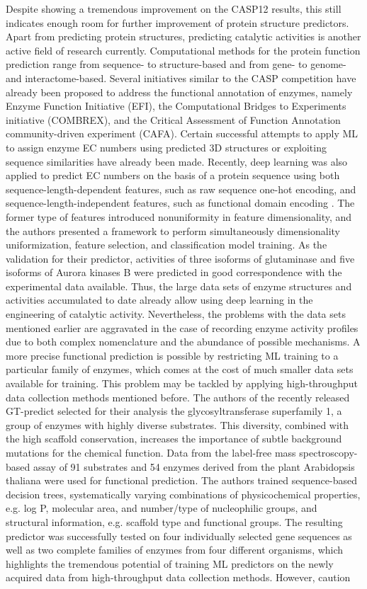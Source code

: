 \documentclass[12pt]{article}
\begin{document}
Despite showing a tremendous improvement on the CASP12 results, this still indicates enough room for further improvement of protein structure predictors. Apart from predicting protein structures, predicting catalytic activities is another active ﬁeld of research currently. Computational methods for the protein function prediction range from sequence- to structure-based and from gene- to genome- and interactome-based\cite{62}. Several initiatives similar to the CASP competition have already been proposed to address the functional annotation of enzymes, namely Enzyme Function Initiative (EFI), the Computational Bridges to Experiments initiative (COMBREX), and the Critical Assessment of Function Annotation community-driven experiment (CAFA). Certain successful attempts to apply ML to assign enzyme EC numbers using predicted 3D structures \cite{63} or exploiting sequence similarities \cite{64} have already been made. Recently, deep learning was also applied to predict EC numbers on the basis of a protein sequence using both sequence-length-dependent features, such as raw sequence one-hot encoding, and sequence-length-independent features, such as functional domain encoding \cite{65}. The former type of features introduced nonuniformity in feature dimensionality, and the authors presented a framework to perform simultaneously dimensionality uniformization, feature selection, and classiﬁcation model training. As the validation for their predictor, activities of three isoforms of glutaminase and ﬁve isoforms of Aurora kinases B were predicted in good correspondence with the experimental data available. Thus, the large data sets of enzyme structures and activities accumulated to date already allow using deep learning in the engineering of catalytic activity. Nevertheless, the problems with the data sets mentioned earlier are aggravated in the case of recording enzyme activity proﬁles due to both complex nomenclature and the abundance of possible mechanisms. A more precise functional prediction is possible by restricting ML training to a particular family of enzymes, which comes at the cost of much smaller data sets available for training. This problem may be tackled by applying high-throughput data collection methods mentioned before. The authors of the recently released GT-predict \cite{66} selected for their analysis the glycosyltransferase superfamily 1, a group of enzymes with highly diverse substrates. This diversity, combined with the high scaﬀold conservation, increases the importance of subtle background mutations for the chemical function. Data from the label-free mass spectroscopy-based assay of 91 substrates and 54 enzymes derived from the plant Arabidopsis thaliana were used for functional prediction. The authors trained sequence-based decision trees, systematically varying combinations of physicochemical properties, e.g. log P, molecular area, and number/type of nucleophilic groups, and structural information, e.g. scaﬀold type and functional groups. The resulting predictor was successfully tested on four individually selected gene sequences as well as two complete families of enzymes from four diﬀerent organisms, which highlights the tremendous potential of training ML predictors on the newly acquired data from high-throughput data collection methods. However, caution 
\end{document}
